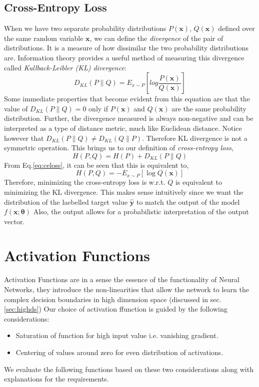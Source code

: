 \subsection*{Cross-Entropy Loss}
When we have two separate probability distributions $P(\bm{x})$, $Q(\bm{x})$ defined over the same random variable $\bm{x}$, we can define the \textit{divergence} of the pair of distributions. It is a measure of how dissimilar the two probability distributions are. Information theory provides a useful method of measuring this divergence called \textit{Kullback-Leibler (KL) divergence}:
\begin{equation}
\label{eq:celoss}
D_{KL}(P \parallel Q) = E_{x \sim P}\left[log \frac{P(\bm{x})}{Q(\bm{x})}\right]
\end{equation}
Some immediate properties that become evident from this equation are that the value of $D_{KL}(P\parallel Q) = 0$ only if $P(\bm{x})$ and $Q(\bm{x})$ are the same probability distribution. Further, the divergence measured is always non-negative and can be interpreted as a type of distance metric, much like Euclidean distance. Notice however that $D_{KL}(P \parallel Q) \neq D_{KL}(Q \parallel P)$. Therefore KL divergence is not a symmetric operation. This brings us to our definition of \textit{cross-entropy loss},
\begin{equation}
H(P,Q) = H(P) + D_{KL}(P \parallel Q)
\end{equation}
From Eq.\ref{eq:celoss}, it can be seen that this is equivalent to,
\begin{equation}
H(P,Q) = -E_{x \sim P}\left[ \log Q(\bm{x})\right]
\end{equation}
Therefore, minimizing the cross-entropy loss is w.r.t. $Q$ is equivalent to minimizing the KL divergence. This makes sense intuitively since we want the distribution of the laebelled target value $\hat{\bm{y}}$ to match the output of the model $f( \bm{x} ; \bm{ \theta } )$ Also, the output allows for a probabilistic interpretation of the output vector.
\section{Activation Functions}
Activation Functions are in a sense the essence of the functionality of Neural Networks, they introduce the non-linearities that allow the network to learn the complex decision boundaries in high dimension space (discussed in sec.\ref{sec:highds}) Our choice of activation ffunction is guided by the following considerations:
\begin{itemize} \itemsep -3pt
\item Saturation of function for high input value i.e. vanishing gradient.
\item Centering of values around zero for even distribution of activations.
\end{itemize}
We evaluate the following functions based on these two considerations along with explanations for the requirements.

